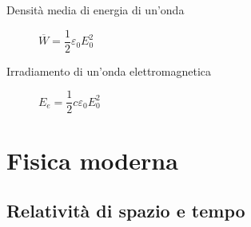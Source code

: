 \documentclass[a4paper,11pt,italian]{article}
\begin{document}
\begin{description}
%
% 
  
  \item[Densità media di energia di un'onda] 
  $ \overline{W} = \dfrac{1}{2} \varepsilon_0 E_0^2 $
  
  \item[Irradiamento di un'onda elettromagnetica]
  $ E_e = \dfrac{1}{2} c \varepsilon_0 E_0^2 $
\end{description}


\newpage
\section{Fisica moderna}

\subsection{Relatività di spazio e tempo}
\end{document}
